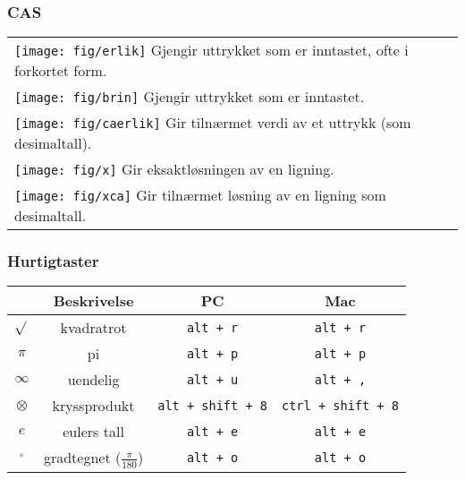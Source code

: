 \subsubsection*{CAS}
\begin{tabular}{@{}l}
	\;\texttt{[image: fig/erlik]} Gjengir uttrykket som er inntastet, ofte i forkortet form.\\	
	\;\texttt{[image: fig/brin]} Gjengir uttrykket som er inntastet.\\	
	\;\texttt{[image: fig/caerlik]} Gir tilnærmet verdi av et uttrykk (som desimaltall). \\	
	\;\texttt{[image: fig/x]} Gir eksaktløsningen av en ligning.\\
	\;\texttt{[image: fig/xca]} Gir tilnærmet løsning av en ligning som desimaltall.\\
	
\end{tabular}

\subsubsection{Hurtigtaster}
\begin{tabular}{@{}c | c |c | c }
	&\textbf{Beskrivelse} & \textbf{PC }& \textbf{Mac} \\ \hline
	$ \sqrt{} $	& kvadratrot& \texttt{alt\,+\,r} &\texttt{alt\,+\,r} \\\hline
	$ \pi $	& pi& \texttt{alt\,+\,p} & \texttt{alt\,+\,p}\\\hline
	$ \infty $ &uendelig& \texttt{alt\,+\,u} &\texttt{alt\,+\,,}  \\\hline
	$ \otimes $&kryssprodukt & \texttt{alt\,+\,shift\,+\,8}&\texttt{ctrl\,+\,shift\,+\,8} \\\hline
	$ e $&eulers tall & \texttt{alt\,+\,e}& \texttt{alt\,+\,e}\\\hline
	$ {}^\circ $&gradtegnet ($ \frac{\pi}{180} $) & \texttt{alt\,+\,o}& \texttt{alt\,+\,o}
	\\\hline	
\end{tabular}
\newpage
\label{commandliststart}
